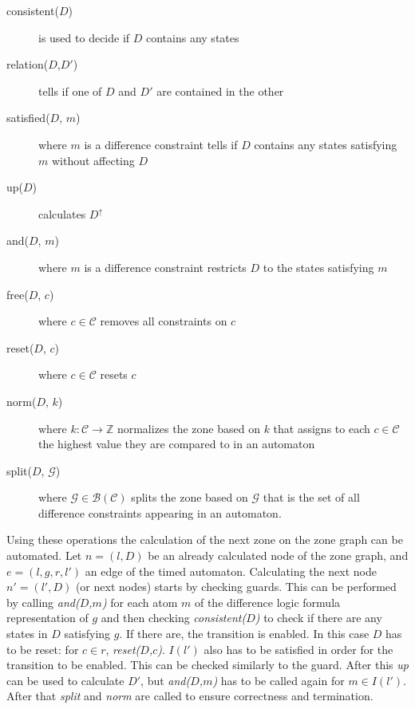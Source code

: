 \begin{description}
	\item [consistent($D$)] is used to decide if $D$ contains any states
	\item [relation($D$,$D'$)] tells if one of $D$ and $D'$ are contained in the other 
	\item [satisfied($D$, $m$)] where $m$ is a difference constraint tells if $D$ contains any states satisfying $m$ without affecting $D$
	\item [up($D$)] calculates $D^\uparrow$
	 \item [and($D$, $m$)] where $m$ is a difference constraint restricts $D$ to the states satisfying $m$
	 \item [free($D$, $c$)] where $c \in \mathcal{C}$  removes all constraints on $c$
	 \item [reset($D$, $c$)] where $c \in \mathcal{C}$ resets $c$
	 \item [norm($D$, $k$)] where $k:\mathcal{C} \to \mathds{Z}$ normalizes the zone based on $k$ that assigns to each $c \in \mathcal{C}$ the highest value they are compared to in an automaton
	 \item [split($D$, $\mathcal{G}$)] where $\mathcal{G} \in \mathcal{B}(\mathcal{C})$ splits the zone based on $\mathcal{G}$ that is the set of all difference constraints appearing in an automaton.
\end{description}

Using these operations the calculation of the next zone on the zone graph can be automated. Let $n=(l,D)$ be an already calculated node of the zone graph, and $e=(l,g,r,l')$ an edge of the timed automaton. Calculating the next node $n'=(l',D)$ (or next nodes) starts by checking guards. This can be performed by calling \emph{and($D$,$m$)} for each atom $m$ of the difference logic formula representation of $g$ and then checking \emph{consistent($D$)} to check if there are any states in $D$ satisfying $g$. If there are, the transition is enabled. In this case $D$ has to be reset: for $c \in r$, \emph{reset($D$,$c$)}. $I(l')$ also has to be satisfied in order for the transition to be enabled. This can be checked similarly to the guard. After this \emph{up} can be used to calculate $D'$, but \emph{and($D$,$m$)} has to be called again for $m \in I(l')$. After that \emph{split} and \emph{norm} are called to ensure correctness and termination.

